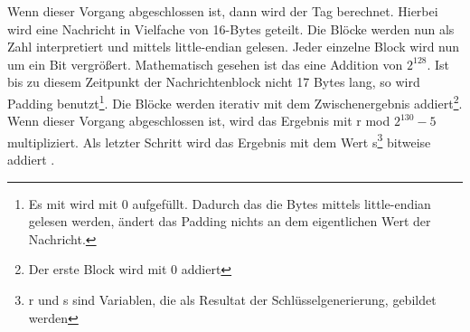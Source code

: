 Wenn dieser Vorgang abgeschlossen ist, dann wird der Tag berechnet. Hierbei wird eine Nachricht in Vielfache von 16-Bytes geteilt. Die Blöcke werden nun als Zahl interpretiert und mittels little-endian gelesen. Jeder einzelne Block wird nun um ein Bit vergrößert. Mathematisch gesehen ist das eine Addition von $2^{128}$. Ist bis zu diesem Zeitpunkt der Nachrichtenblock nicht 17 Bytes lang, so wird Padding benutzt\footnote[14]{Es mit wird mit 0 aufgefüllt. Dadurch das die Bytes mittels little-endian gelesen werden, ändert das Padding nichts an dem eigentlichen Wert der Nachricht.}. Die Blöcke werden iterativ mit dem Zwischenergebnis addiert\footnote[15]{Der erste Block wird mit 0 addiert}. Wenn dieser Vorgang abgeschlossen ist, wird das Ergebnis mit r mod $2^{130}-5$ multipliziert. Als letzter Schritt wird das Ergebnis mit dem Wert s\footnote[16]{r und s sind Variablen, die als Resultat der Schlüsselgenerierung, gebildet werden} bitweise addiert \cite{rfc7539}.

